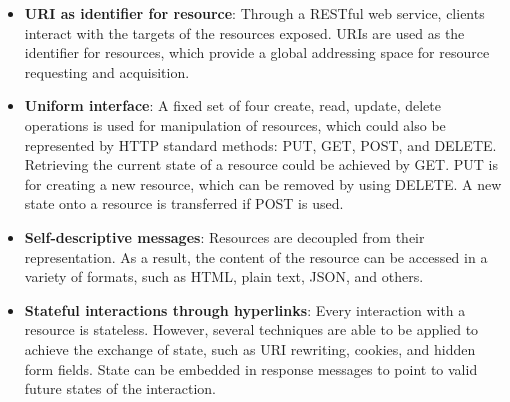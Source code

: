 \begin{itemize}
  \item \textbf{URI as identifier for resource}:  Through a RESTful web service, clients interact with the targets of the resources exposed. URIs are used as the identifier for resources, which provide a global addressing space for resource requesting and acquisition. 

  \item \textbf{Uniform interface}:  A fixed set of four create, read, update, delete operations is used for manipulation of resources, which could also be represented by HTTP standard methods: PUT, GET, POST, and DELETE.  Retrieving the current state of a resource could be achieved by GET. PUT is for creating a new resource, which can be removed by using DELETE. A new state onto a resource is transferred if POST is used.

  \item \textbf{Self-descriptive messages}:  Resources are decoupled from their representation. As a result, the content of the resource can be accessed in a variety of formats, such as HTML, plain text, JSON, and others.

  \item \textbf{Stateful interactions through hyperlinks}:  Every interaction with a resource is stateless. However, several techniques are able to be applied to achieve the exchange of state, such as URI rewriting, cookies, and hidden form fields. State can be embedded in response messages to point to valid future states of the interaction\cite{tutorial6oracle}. 


\end{itemize}






